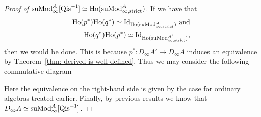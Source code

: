 \documentclass[../thesis.tex]{subfiles}
\begin{document}
\begin{proof}[Proof of $\tt{suMod}_\infty^A{[\tt{Qis}^{-1}]} \simeq \tt{Ho}(\tt{suMod}_{\infty, \tt{strict}}^A)$]
                 If we have that 
                 \begin{align*}
                    \tt{Ho}(p^*)\tt{Ho}(q^*) \simeq \tt{Id}_{\tt{Ho}(\tt{suMod}_{\infty,\tt{strict}}^A)}\tt{ and} \\
                    \tt{Ho}(q^*)\tt{Ho}(p^*) \simeq \tt{Id}_{\tt{Ho}(\tt{suMod}_{\infty,\tt{strict}}^{A'})}\tt{,}
                 \end{align*}
                 then we would be done. This is because $p^* : D_\infty A' \rightarrow D_\infty A$ induces an equivalence by Theorem~\ref{thm: derived-is-well-defined}. Thus we may consider the following commutative diagram
                 \begin{center}
                 \end{center}
                 Here the equivalence on the right-hand side is given by the case for ordinary algebras treated earlier. Finally, by previous results we know that $D_\infty A \simeq \tt{suMod}_{\infty}^A[\tt{Qis}^{-1}]$\tt{.}
                 

\end{proof}
\end{document}
